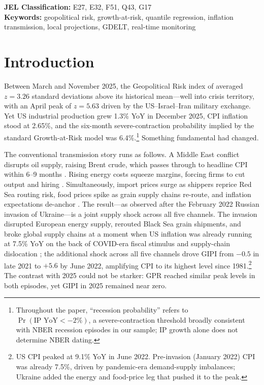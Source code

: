 \documentclass[12pt]{article}
\begin{document}
\newpage\setcounter{page}{1}

\noindent\textbf{JEL Classification:} E27, E32, F51, Q43, G17\\[4pt]
\noindent\textbf{Keywords:} geopolitical risk, growth-at-risk, quantile regression,
inflation transmission, local projections, GDELT, real-time monitoring

\bigskip

\section{Introduction}

Between March and November 2025, the Geopolitical Risk index of
\citet{caldara2022} averaged $z = 3.26$ standard deviations above its
historical mean---well into crisis territory, with an April peak of
$z = 5.63$ driven by the US--Israel--Iran military exchange.
Yet US industrial production grew 1.3\% YoY in December 2025,
CPI inflation stood at 2.65\%, and the six-month severe-contraction probability
implied by the standard Growth-at-Risk model was 6.4\%.\footnote{%
  Throughout the paper, ``recession probability'' refers to
  $\Pr(\text{IP YoY} < -2\%)$, a severe-contraction threshold broadly
  consistent with NBER recession episodes in our sample; IP growth alone
  does not determine NBER dating.}
Something fundamental had changed.

The conventional transmission story runs as follows.
A Middle East conflict disrupts oil supply, raising Brent crude, which
passes through to headline CPI within 6--9 months \citep{conflitti2019}.
Rising energy costs squeeze margins, forcing firms to cut output and
hiring \citep{bloom2009}.
Simultaneously, import prices surge as shippers reprice Red Sea routing
risk, food prices spike as grain supply chains re-route, and inflation
expectations de-anchor \citep{caldara2025}.
The result---as observed after the February 2022 Russian invasion
of Ukraine---is a joint supply shock across all five channels.
The invasion disrupted European energy supply, rerouted Black Sea
grain shipments, and broke global supply chains at a moment when
US inflation was already running at 7.5\% YoY on the back of
COVID-era fiscal stimulus and supply-chain dislocation
\citep{bernanke2023}; the additional shock across all five
channels drove GIPI from $-0.5$ in late 2021 to $+5.6$ by
June 2022, amplifying CPI to its highest level since 1981.\footnote{%
  US CPI peaked at 9.1\% YoY in June 2022.
  Pre-invasion (January 2022) CPI was already 7.5\%, driven by
  pandemic-era demand-supply imbalances; Ukraine added the energy
  and food-price leg that pushed it to the peak.}
The contrast with 2025 could not be starker: GPR reached similar
peak levels in both episodes, yet GIPI in 2025 remained near zero.
\end{document}

